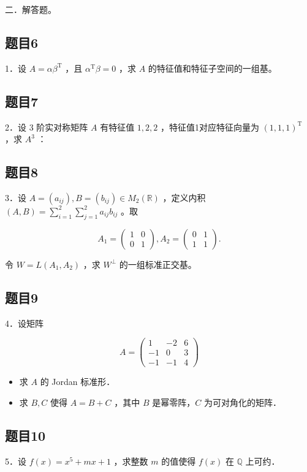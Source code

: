 \documentclass{article}
\begin{document}
二．解答题。\\

\subsection{题目6}
1．设 \(A=\alpha \beta^{\mathrm{T}}\) ，且 \(\alpha^{\mathrm{T}} \beta=0\) ，求 \(A\) 的特征值和特征子空间的一组基。

\subsection{题目7}
2．设 3 阶实对称矩阵 \(A\) 有特征值 \(1,2,2\) ，特征值1对应特征向量为 \((1,1,1)^{\mathrm{T}}\) ，求 \(A^{3}\) ：

\subsection{题目8}
3．设 \(A=\left(a_{i j}\right), B=\left(b_{i j}\right) \in M_{2}(\mathbb{R})\) ，定义内积 \((A, B)=\sum_{i=1}^{2} \sum_{j=1}^{2} a_{i j} b_{i j}\) 。取

\[
A_{1}=\left(\begin{array}{ll}
1 & 0 \\
0 & 1
\end{array}\right), A_{2}=\left(\begin{array}{ll}
0 & 1 \\
1 & 1
\end{array}\right) .
\]

令 \(W=L\left(A_{1}, A_{2}\right)\) ，求 \(W^{\perp}\) 的一组标准正交基。

\subsection{题目9}
4．设矩阵

\[
A=\left(\begin{array}{ccc}
1 & -2 & 6 \\
-1 & 0 & 3 \\
-1 & -1 & 4
\end{array}\right)
\]

\begin{itemize}
  \item[（1）] 求 \(A\) 的 Jordan 标准形．
  \item[（2）] 求 \(B, C\) 使得 \(A=B+C\) ，其中 \(B\) 是幂零阵，\(C\) 为可对角化的矩阵．
\end{itemize}

\subsection{题目10}
5．设 \(f(x)=x^{5}+m x+1\) ，求整数 \(m\) 的值使得 \(f(x)\) 在 \(\mathbb{Q}\) 上可约．
\end{document}
